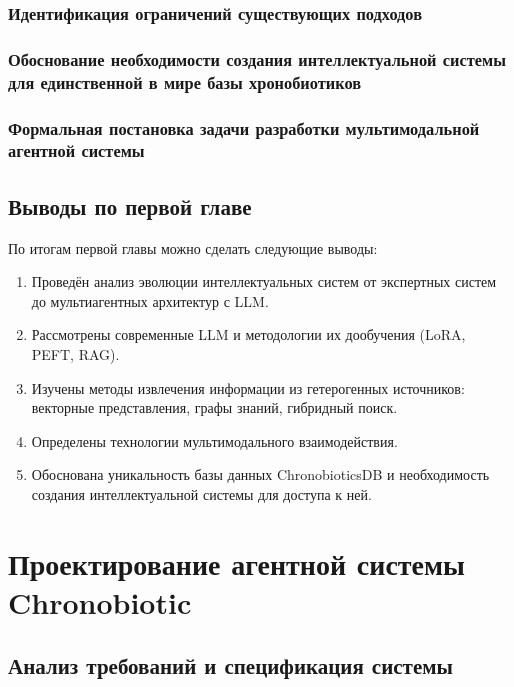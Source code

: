 \documentclass{syksu-coursework}
\begin{document}
\subsubsection{Идентификация ограничений существующих подходов}

\subsubsection{Обоснование необходимости создания интеллектуальной системы для единственной в мире базы хронобиотиков}

\subsubsection{Формальная постановка задачи разработки мультимодальной агентной системы}

\subsection*{Выводы по первой главе}

По итогам первой главы можно сделать следующие выводы:

\begin{enumerate}
    \item Проведён анализ эволюции интеллектуальных систем от экспертных систем до мультиагентных архитектур с LLM.
    \item Рассмотрены современные LLM и методологии их дообучения (LoRA, PEFT, RAG).
    \item Изучены методы извлечения информации из гетерогенных источников: векторные представления, графы знаний, гибридный поиск.
    \item Определены технологии мультимодального взаимодействия.
    \item Обоснована уникальность базы данных ChronobioticsDB и необходимость создания интеллектуальной системы для доступа к ней.
\end{enumerate}

\newpage

\section{Проектирование агентной системы Chronobiotic}

\subsection{Анализ требований и спецификация системы}
\end{document}
